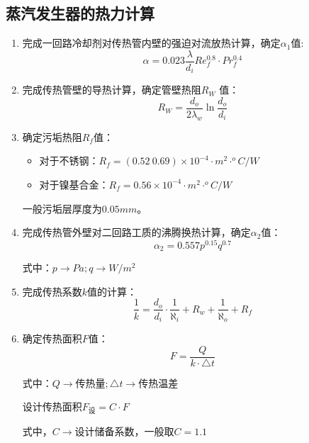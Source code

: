 \subsection{蒸汽发生器的热力计算}
\begin{enumerate}
    \item 完成一回路冷却剂对传热管内壁的强迫对流放热计算，确定$ \alpha_{1} $值:
          \begin{equation*}
              \alpha = 0.023 \frac{\lambda}{d_{i}} Re_{f}^{0.8} \cdot Pr_{f}^{0.4}
          \end{equation*}
    \item 完成传热管壁的导热计算，确定管壁热阻$ R_W $ 值：
          \begin{equation*}
              R_W = \frac{d_{o}}{2\lambda_w} \ln \frac{d_{o}}{d_{i}}
          \end{equation*}
    \item 确定污垢热阻$ R_f $值：
          \begin{itemize}
              \item 对于不锈钢：$ R_f = (0.52~0.69)\times 10^{-4} \cdot m^2 \cdot ^oC / W$
              \item 对于镍基合金：$ R_f = 0.56 \times 10^{-4} \cdot m^2 \cdot ^oC / W$
          \end{itemize}
          一般污垢层厚度为$ 0.05mm $。
    \item 完成传热管外壁对二回路工质的沸腾换热计算，确定$ \alpha_2 $值：
          \begin{equation*}
              \alpha_2 = 0.557p^{0.15}q^{0.7}
          \end{equation*}
          \begin{center}
              式中：$ p \longrightarrow Pa;q \longrightarrow W/m^2 $
          \end{center}
    \item 完成传热系数$ k $值的计算：
          \begin{equation*}
              \frac{1}{k} = \frac{d_o}{d_i} \cdot \frac{1}{\aleph_i} + R_w + \frac{1}{\aleph_o} + R_f
          \end{equation*}
    \item 确定传热面积$ F $值：
          \begin{equation*}
              F = \frac{Q}{k \cdot \bigtriangleup t}
          \end{equation*}
          \begin{center}
              式中：$ Q \longrightarrow \text{传热量}; \bigtriangleup t \longrightarrow \text{传热温差} $
          \end{center}
          设计传热面积$ F_{\text{设}} = C \cdot F $
          \par 式中，$ C \longrightarrow \text{设计储备系数，一般取} C = 1.1 $
\end{enumerate}

